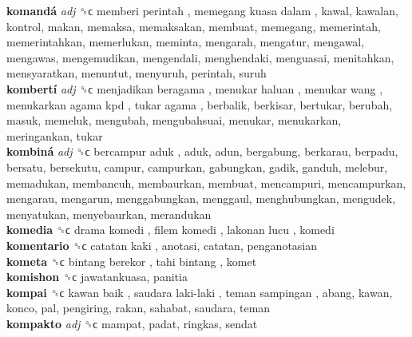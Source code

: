 \textbf{komandá} \emph{adj}  ␝ϲ   memberi perintah ,  memegang kuasa dalam , kawal, kawalan, kontrol, makan, memaksa, memaksakan, membuat, memegang, memerintah, memerintahkan, memerlukan, meminta, mengarah, mengatur, mengawal, mengawas, mengemudikan, mengendali, menghendaki, menguasai, menitahkan, mensyaratkan, menuntut, menyuruh, perintah, suruh  \\
\textbf{kombertí} \emph{adj}  ␝ϲ   menjadikan beragama ,  menukar haluan ,  menukar wang ,  menukarkan agama kpd ,  tukar agama , berbalik, berkisar, bertukar, berubah, masuk, memeluk, mengubah, mengubahsuai, menukar, menukarkan, meringankan, tukar  \\
\textbf{kombiná} \emph{adj}  ␝ϲ   bercampur aduk , aduk, adun, bergabung, berkarau, berpadu, bersatu, bersekutu, campur, campurkan, gabungkan, gadik, ganduh, melebur, memadukan, membancuh, membaurkan, membuat, mencampuri, mencampurkan, mengarau, mengarun, menggabungkan, menggaul, menghubungkan, mengudek, menyatukan, menyebaurkan, merandukan  \\
\textbf{komedia} ␝ϲ   drama komedi ,  filem komedi ,  lakonan lucu , komedi  \\
\textbf{komentario} ␝ϲ   catatan kaki , anotasi, catatan, penganotasian  \\
\textbf{kometa} ␝ϲ   bintang berekor ,  tahi bintang , komet  \\
\textbf{komishon} ␝ϲ  jawatankuasa, panitia  \\
\textbf{kompai} ␝ϲ   kawan baik ,  saudara laki-laki ,  teman sampingan , abang, kawan, konco, pal, pengiring, rakan, sahabat, saudara, teman  \\
\textbf{kompakto} \emph{adj}  ␝ϲ  mampat, padat, ringkas, sendat  \\
